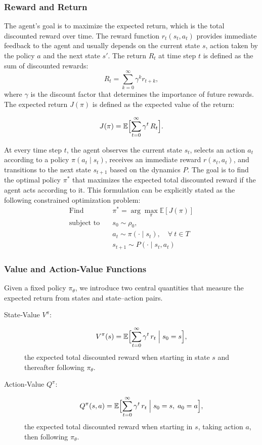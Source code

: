 \subsubsection{Reward and Return}
The agent's goal is to maximize the expected return, which is the total discounted reward over time. 
The reward function \(r_t(s_t,a_t)\) provides immediate feedback to the agent and usually depends on the current state \(s\), action taken by the policy \(a\) and the next state \(s'\). The return \(R_t\) at time step \(t\) is defined as the sum of discounted rewards:
\[
R_t = \sum_{k=0}^{\infty} \gamma^k r_{t+k},
\]
where \(\gamma\) is the discount factor that determines the importance of future rewards. The expected return \(J(\pi)\) is defined as the expected value of the return:

\[
J(\pi) = \mathbb{E}\Bigl[\sum_{t=0}^\infty \gamma^t\,R_t\Bigr].
\]

At every time step \(t\), the agent observes the current state \(s_t\), selects an action \(a_t\) according to a policy \(\pi(a_t\mid s_t)\), receives an immediate reward \(r(s_t,a_t)\), and transitions to the next state \(s_{t+1}\) based on the dynamics \(P\). The goal is to find the optimal policy \(\pi^*\) that maximizes the expected total discounted reward if the agent acts according to it. This formulation can be explicitly stated as the following constrained optimization problem:
\begin{equation}\label{eq:RL_opt}
\begin{aligned}
\text{Find} \quad & \pi^* = \arg\max_{\pi} \mathbb{E}\left[J(\pi)\right] \\
\text{subject to} \quad & s_0 \sim \rho_0, \\
& a_t \sim \pi(\cdot \mid s_t), \quad \forall\ t \in T \\
& s_{t+1} \sim P(\cdot \mid s_t, a_t)
\end{aligned}
\end{equation}

\subsubsection{Value and Action‐Value Functions}

Given a fixed policy \(\pi_\theta\), we introduce two central quantities that measure the expected return from states and state–action pairs.

\begin{description}
  \item[State‐Value \(V^\pi\):]
    \[
      V^\pi(s)
      = \mathbb{E}\Bigl[\sum_{t=0}^{\infty}\gamma^t\,r_t
      \;\Big|\;s_0 = s\Bigr],
    \]
    the expected total discounted reward when starting in state \(s\) and thereafter following \(\pi_\theta\).
  
  \item[Action‐Value \(Q^\pi\):]
    \[
      Q^\pi(s,a)
      = \mathbb{E}\Bigl[\sum_{t=0}^{\infty}\gamma^t\,r_t
      \;\Big|\;s_0 = s,\;a_0 = a\Bigr],
    \]
    the expected total discounted reward when starting in \(s\), taking action \(a\), then following \(\pi_\theta\).
\end{description}

